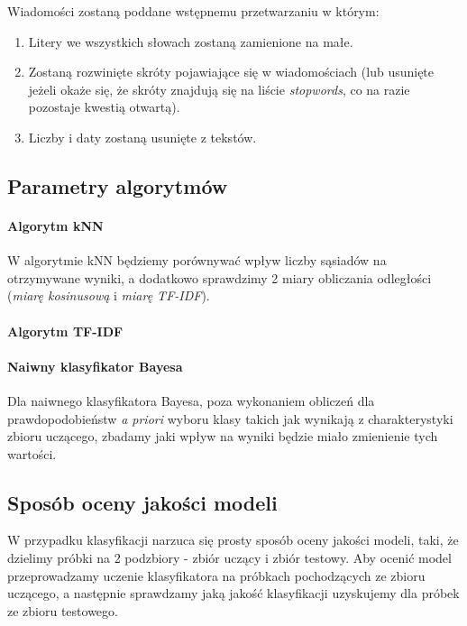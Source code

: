 \documentclass[a4paper,12pt]{article}
\begin{document}
Wiadomości zostaną poddane wstępnemu przetwarzaniu w którym:

\begin{enumerate}
	\item Litery we wszystkich słowach zostaną zamienione na małe.
	\item Zostaną rozwinięte skróty pojawiające się w wiadomościach (lub usunięte jeżeli okaże się, że skróty znajdują się na liście \textit{stopwords}, co na razie pozostaje kwestią otwartą).
	\item Liczby i daty zostaną usunięte z tekstów.
\end{enumerate}

\subsection{Parametry algorytmów}

\paragraph{Algorytm kNN}

W algorytmie kNN będziemy porównywać wpływ liczby sąsiadów na otrzymywane wyniki, a dodatkowo sprawdzimy 2 miary obliczania odległości (\textit{miarę kosinusową} i \textit{miarę TF-IDF}).

\paragraph{Algorytm TF-IDF}

\paragraph{Naiwny klasyfikator Bayesa}

Dla naiwnego klasyfikatora Bayesa, poza wykonaniem obliczeń dla prawdopodobieństw \textit{a priori} wyboru klasy takich jak wynikają z charakterystyki zbioru uczącego, zbadamy jaki wpływ na wyniki będzie miało zmienienie tych wartości.

\subsection{Sposób oceny jakości modeli}

W przypadku klasyfikacji narzuca się prosty sposób oceny jakości modeli, taki, że dzielimy próbki na 2 podzbiory - zbiór uczący i zbiór testowy. Aby ocenić model przeprowadzamy uczenie klasyfikatora na próbkach pochodzących ze zbioru uczącego, a następnie sprawdzamy jaką jakość klasyfikacji uzyskujemy dla próbek ze zbioru testowego.\\
\end{document}
